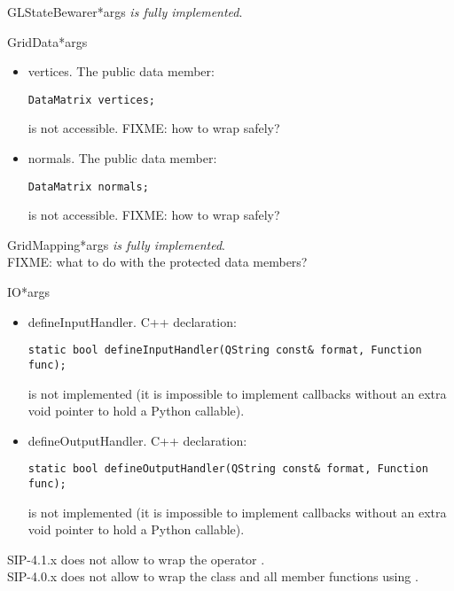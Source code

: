 \documentclass{manual}
\begin{document}
\begin{classdesc}{GLStateBewarer}{*args}
\emph{is fully implemented}.
\end{classdesc}

\begin{classdesc}{GridData}{*args}
  \begin{itemize}
  \item{vertices}. The public data member:
\begin{verbatim}
DataMatrix vertices;
\end{verbatim}
    is not accessible. FIXME: how to wrap  safely?
  \item{normals}. The public data member:
\begin{verbatim}
DataMatrix normals;
\end{verbatim}
    is not accessible. FIXME: how to wrap  safely?
  \end{itemize}
\end{classdesc}

\begin{classdesc}{GridMapping}{*args}
\emph{is fully implemented}.\\
FIXME: what to do with the protected data members?
\end{classdesc}

\begin{classdesc}{IO}{*args}
  \begin{itemize}
  \item{defineInputHandler}. C++ declaration:
\begin{verbatim}
static bool defineInputHandler(QString const& format, Function func);
\end{verbatim}
    is not implemented (it is impossible to implement callbacks without an
    extra void pointer to hold a Python callable).
  \item{defineOutputHandler}. C++ declaration:
\begin{verbatim}
static bool defineOutputHandler(QString const& format, Function func);
\end{verbatim}
    is not implemented (it is impossible to implement callbacks without an
    extra void pointer to hold a Python callable).
  \end{itemize}
  SIP-4.1.x does not allow to wrap the operator
  .\\
  SIP-4.0.x does not allow to wrap the class  and all member
  functions using .
\end{classdesc}
\end{document}
